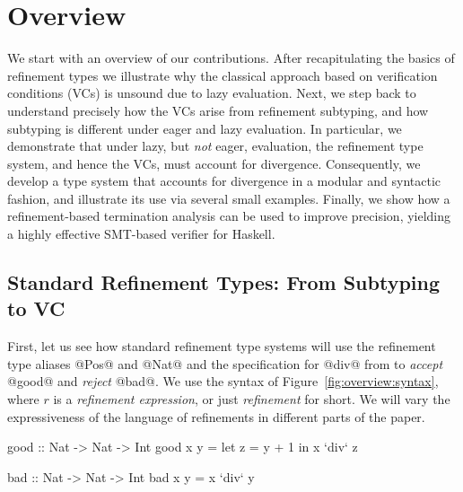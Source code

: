 \section{Overview}\label{sec:overview}

We start with an overview of our contributions. 
%
After recapitulating the basics of refinement types
we illustrate why the classical approach based on 
verification conditions (VCs) is unsound due to 
lazy evaluation.  
%
Next, we step back to understand precisely how the 
VCs arise from refinement subtyping, and how subtyping
is different under eager and lazy evaluation. 
In particular, we demonstrate that under lazy, but 
\emph{not} eager, evaluation, the refinement type 
system, and hence the VCs, must account for divergence.
%
Consequently, we develop a type system that accounts 
for divergence in a modular and syntactic fashion, 
and illustrate its use via several small examples.
%
Finally, we show how a refinement-based termination
analysis can be used to improve precision, yielding 
a highly effective SMT-based verifier for Haskell.

\subsection{Standard Refinement Types: From Subtyping to VC}\label{subsec:vc}

First, let us see how standard refinement type systems 
\citep{LiquidPLDI08, Knowles10} will 
use
the refinement type aliases @Pos@ and @Nat@ 
and the specification for @div@ from 
%
to \emph{accept} @good@ and
\emph{reject} @bad@.
We use the syntax of Figure~\ref{fig:overview:syntax}, where $r$ is a
\emph{refinement expression}, or just \emph{refinement} for short.
We will vary the expressiveness of the language of refinements in
different parts of the paper.
%
\begin{code}
    good     :: Nat -> Nat -> Int
    good x y = let z = y + 1 in x `div` z

    bad      :: Nat -> Nat -> Int
    bad x y  = x `div` y
\end{code}

